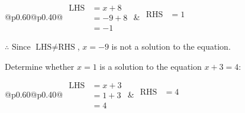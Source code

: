 \documentclass[12pt]{article}
\newcounter{minipagecount}
\begin{document}
\begin{multicols}{2}
\begin{minipage}[t]{0.40\textwidth}
    \noindent
    \renewcommand{\arraystretch}{1.3} %
    \begin{tabular}{@{}p{0.60\linewidth}@{}p{0.40\linewidth}@{}}
        \(\begin{aligned}
            \text{LHS} &= x + 8 \\
                    &= -9 + 8 \\
                    &= -1
        \end{aligned}\) &
        \(\begin{aligned}
            \text{RHS} &= 1\\
                    & \\
                    &
        \end{aligned}\)
    \end{tabular}
    \renewcommand{\arraystretch}{1.0} %
    \vspace{2pt}  %

    \noindent \(\therefore\) Since \(\text{LHS} \neq \text{RHS}\), \(x = -9\) is not  a solution to the equation.

\end{minipage}

 \vspace*{16pt}
\noindent{(\theminipagecount)}\hspace{0.1mm} %
\begin{minipage}[t]{0.40\textwidth} %

    \noindent Determine whether \(x = 1\) is a solution to the equation \(x + 3 = 4\):
    \vspace{4pt}  %

    \noindent
    \renewcommand{\arraystretch}{1.3} %
    \begin{tabular}{@{}p{0.60\linewidth}@{}p{0.40\linewidth}@{}}
        \(\begin{aligned}
            \text{LHS} &= x + 3 \\
                    &= 1 + 3 \\
                    &= 4
        \end{aligned}\) &
        \(\begin{aligned}
            \text{RHS} &= 4\\
                    & \\
                    &
        \end{aligned}\)
    \end{tabular}
    \renewcommand{\arraystretch}{1.0} %
    \vspace{2pt}  %


\end{minipage}
\end{multicols}
\end{document}
